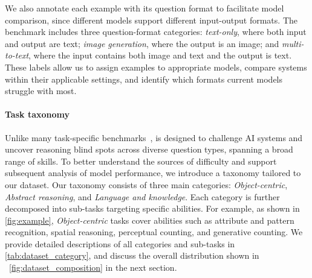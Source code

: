 We also annotate each example with its question format to facilitate model comparison, since different models support different input-output formats. The benchmark includes three question-format categories: \textit{text-only}, where both input and output are text; \textit{image generation}, where the output is an image; and \textit{multi-to-text}, where the input contains both image and text and the output is text. These labels allow us to assign examples to appropriate models, compare systems within their applicable settings, and identify which formats current models struggle with most. 

\paragraph{Task taxonomy}
Unlike many task-specific benchmarks~\cite{longbench,chartqa,spatialab}, \bench is designed to challenge AI systems and uncover reasoning blind spots across diverse question types, spanning a broad range of skills. To better understand the sources of difficulty and support subsequent analysis of model performance, we introduce a taxonomy tailored to our dataset.
Our taxonomy consists of three main categories: \emph{Object-centric}, \emph{Abstract reasoning}, and \emph{Language and knowledge}. Each category is further decomposed into sub-tasks targeting specific abilities. For example, as shown in \autoref{fig:example}, \emph{Object-centric} tasks cover abilities such as attribute and pattern recognition, spatial reasoning, perceptual counting, and generative counting.  We provide detailed descriptions of all categories and sub-tasks in \autoref{tab:dataset_category}, and discuss the overall distribution shown in ~\autoref{fig:dataset_composition} in the next section.

